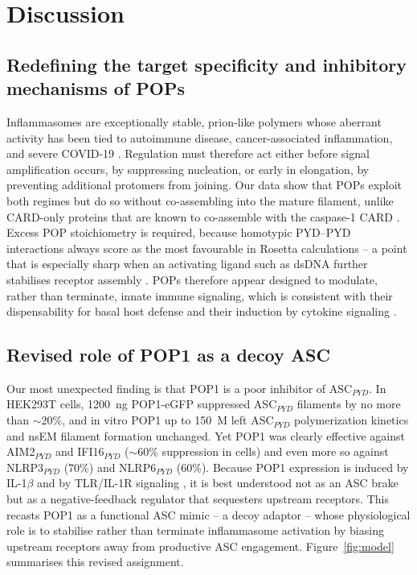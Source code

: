 \documentclass[11pt]{article}
\begin{document}
\section{Discussion}

\subsection{Redefining the target specificity and inhibitory mechanisms of
POPs}

Inflammasomes are exceptionally stable, prion-like polymers whose aberrant
activity has been tied to autoimmune disease, cancer-associated
inflammation, and severe COVID-19
\citep{cai2014prion, franklin2014adaptor, sharma2018pyrin,
vora2021inflammasome, junqueira2022sarscov2}. Regulation must therefore
act either before signal amplification occurs, by suppressing nucleation,
or early in elongation, by preventing additional protomers from joining.
Our data show that POPs exploit both regimes but do so without
co-assembling into the mature filament, unlike CARD-only proteins that
are known to co-assemble with the caspase-1 CARD
\citep{indramohan2018cops}. Excess POP stoichiometry is required, because
homotypic PYD--PYD interactions always score as the most favourable in
Rosetta calculations -- a point that is especially sharp when an
activating ligand such as dsDNA further stabilises receptor assembly
\citep{morrone2015assembly}. POPs therefore appear designed to modulate,
rather than terminate, innate immune signaling, which is consistent with
their dispensability for basal host defense and their induction by
cytokine signaling \citep{dealmeida2015pyrin, ratsimandresy2017pop2,
khare2014pop3}.

\subsection{Revised role of POP1 as a decoy ASC}

Our most unexpected finding is that POP1 is a poor inhibitor of
ASC$_{PYD}$. In HEK293T cells, 1200~ng POP1-eGFP suppressed ASC$_{PYD}$
filaments by no more than $\sim$20\%, and in vitro POP1 up to
150~\textmu M left ASC$_{PYD}$ polymerization kinetics and nsEM
filament formation unchanged. Yet POP1 was clearly effective against
AIM2$_{PYD}$ and IFI16$_{PYD}$ ($\sim$60\% suppression in cells) and even
more so against NLRP3$_{PYD}$ (70\%) and NLRP6$_{PYD}$ (60\%). Because
POP1 expression is induced by IL-1$\beta$ and by TLR/IL-1R signaling
\citep{dealmeida2015pyrin}, it is best understood not as an ASC brake
but as a negative-feedback regulator that sequesters upstream receptors.
This recasts POP1 as a functional ASC mimic -- a decoy adaptor -- whose
physiological role is to stabilise rather than terminate inflammasome
activation by biasing upstream receptors away from productive ASC
engagement. Figure~\ref{fig:model} summarises this revised assignment.
\end{document}
